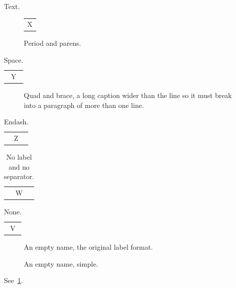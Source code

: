 \documentclass{article}
\begin{document}
Text.
\begin{figure}[h]
\centering
\begin{tabular}{c}X\end{tabular}
\caption{Period and parens.}
\label{fig:a}
\end{figure}
\begin{table}[h]
\captionsetup{labelsep=space}
\caption{Space.}
\begin{tabular}{c}Y\end{tabular}
\end{table}
\begin{figure}[h]
\captionsetup{labelsep=quad,labelformat=brace}
\caption{Quad and brace, a long caption wider than the line so it must break into a paragraph of more than one line.}
\end{figure}
\begin{table}[h]
\captionsetup{labelsep=endash,labelformat=simple,labelfont=bf}
\caption{Endash.}
\begin{tabular}{c}Z\end{tabular}
\end{table}
\begin{table}[h]
\captionsetup{labelformat=empty}
\caption{No label and no separator.}
\begin{tabular}{c}W\end{tabular}
\end{table}
\begin{table}[h]
\captionsetup{labelsep=none,name=Tabelle}
\caption{None.}
\begin{tabular}{c}V\end{tabular}
\end{table}
\begin{figure}[h]
\caption{An empty name, the original label format.}
\end{figure}
\begin{figure}[h]
\caption{An empty name, simple.}
\end{figure}
See~\ref{fig:a}.
\end{document}

